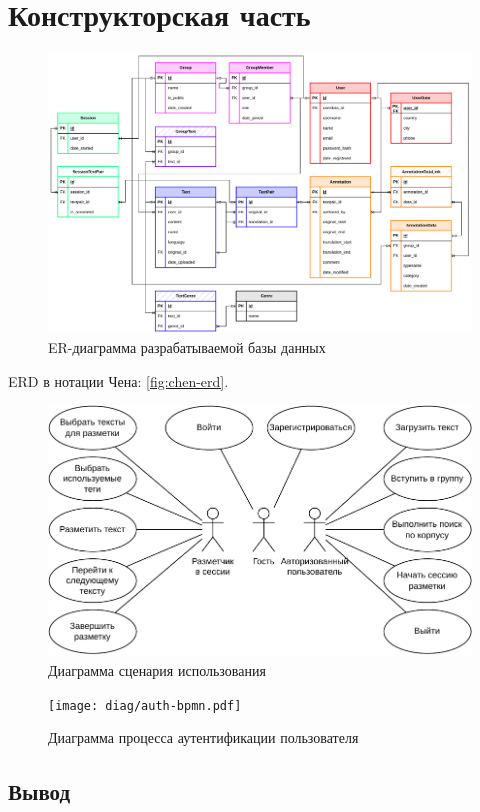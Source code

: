 \section{Конструкторская часть}




\begin{figure}[H]
	\centering
	\includegraphics[width=\textwidth]{diag/erd-color.pdf}
	\caption{ER-диаграмма разрабатываемой базы данных}
	\label{fig:erd}
\end{figure}

ERD в нотации Чена: \ref{fig:chen-erd}.


\begin{figure}[H]
	\centering
	\includegraphics[width=\textwidth]{diag/use-case.pdf}
	\caption{Диаграмма сценария использования}
	\label{fig:use-case}
\end{figure}

\begin{figure}[H]
	\centering
	\texttt{[image: diag/auth-bpmn.pdf]}
	\caption{Диаграмма процесса аутентификации пользователя}
	\label{fig:auth-bpmn}
\end{figure}

\subsection{Вывод}
